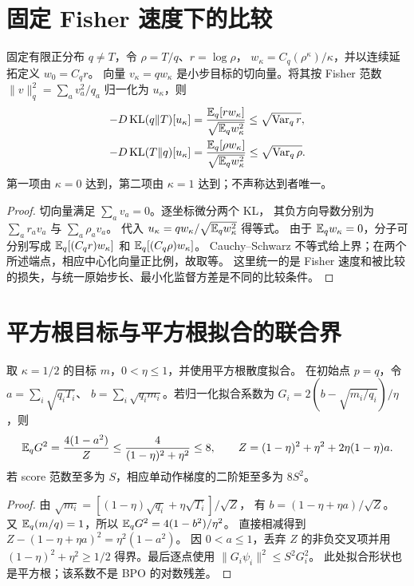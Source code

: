 \section{固定 Fisher 速度下的比较}
\begin{proposition}[共同损失下的最陡形状]
\label{prop:fisher-shape}
固定有限正分布 $q\ne T$，令 $\rho=T/q$、$r=\log\rho$，
$w_\kappa=C_q(\rho^\kappa)/\kappa$，并以连续延拓定义 $w_0=C_qr$。
向量 $v_\kappa=q w_\kappa$ 是小步目标的切向量。将其按 Fisher 范数
$\|v\|_q^2=\sum_a v_a^2/q_a$ 归一化为 $u_\kappa$，则
\begin{align}
-D\operatorname{KL}(q\Vert T)[u_\kappa]
 &=\frac{\mathbb E_q[rw_\kappa]}{\sqrt{\mathbb E_qw_\kappa^2}}
 \le\sqrt{\operatorname{Var}_qr},\\
-D\operatorname{KL}(T\Vert q)[u_\kappa]
 &=\frac{\mathbb E_q[\rho w_\kappa]}{\sqrt{\mathbb E_qw_\kappa^2}}
 \le\sqrt{\operatorname{Var}_q\rho}.
\end{align}
第一项由 $\kappa=0$ 达到，第二项由 $\kappa=1$ 达到；不声称达到者唯一。
\end{proposition}
\begin{proof}
切向量满足 $\sum_a v_a=0$。逐坐标微分两个 KL，
其负方向导数分别为 $\sum_a r_av_a$ 与 $\sum_a\rho_av_a$。
代入 $u_\kappa=q w_\kappa/\sqrt{\mathbb E_qw_\kappa^2}$ 得等式。
由于 $\mathbb E_qw_\kappa=0$，分子可分别写成
$\mathbb E_q[(C_qr)w_\kappa]$ 和 $\mathbb E_q[(C_q\rho)w_\kappa]$。
Cauchy--Schwarz 不等式给上界；在两个所述端点，相应中心化向量正比例，故取等。
这里统一的是 Fisher 速度和被比较的损失，与统一原始步长、最小化监督方差是不同的比较条件。
\end{proof}

\section{平方根目标与平方根拟合的联合界}
\begin{proposition}[初始拟合系数的统一二阶矩]
\label{prop:root-joint}
取 $\kappa=1/2$ 的目标 $m$，$0<\eta\le1$，并使用平方根散度拟合。
在初始点 $p=q$，令 $a=\sum_i\sqrt{q_iT_i}$、
$b=\sum_i\sqrt{q_im_i}$。若归一化拟合系数为
$G_i=2(b-\sqrt{m_i/q_i})/\eta$，则
\begin{equation}
\mathbb E_qG^2=\frac{4(1-a^2)}{Z}
\le\frac4{(1-\eta)^2+\eta^2}\le8,\qquad
Z=(1-\eta)^2+\eta^2+2\eta(1-\eta)a.
\end{equation}
若 score 范数至多为 $S$，相应单动作梯度的二阶矩至多为 $8S^2$。
\end{proposition}
\begin{proof}
由 $\sqrt{m_i}=[(1-\eta)\sqrt{q_i}+\eta\sqrt{T_i}]/\sqrt Z$，
有 $b=(1-\eta+\eta a)/\sqrt Z$。
又 $\mathbb E_q(m/q)=1$，所以 $\mathbb E_qG^2=4(1-b^2)/\eta^2$。
直接相减得到 $Z-(1-\eta+\eta a)^2=\eta^2(1-a^2)$。
因 $0<a\le1$，丢弃 $Z$ 的非负交叉项并用
$(1-\eta)^2+\eta^2\ge1/2$ 得界。最后逐点使用
$\|G_i\psi_i\|^2\le S^2G_i^2$。
此处拟合形状也是平方根；该系数不是 BPO 的对数残差。
\end{proof}


